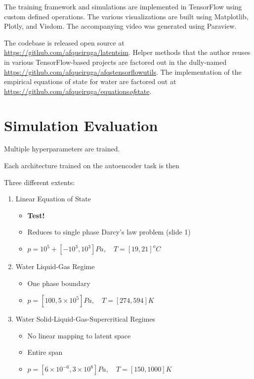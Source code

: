 \documentclass[]{article}
\begin{document}
The training framework and simulations are implemented in TensorFlow
using custom defined operations. The various visualizations are built
using Matplotlib, Plotly, and Visdom. The accompanying video was
generated using Paraview.

The codebase is released open source at
\url{https://github.com/afqueiruga/latentsim}. Helper methods that the
author reuses in various TensorFlow-based projects are factored out in
the dully-named \url{https://github.com/afqueiruga/afqstensorflowutils}.
The implementation of the empirical equations of state for water are
factored out at
\href{https://github.com/afqueiruga/equations_of_state}{https://github.com/afqueiruga/equations\emph{of}state}.

\hypertarget{header-n3359}{%
\section{Simulation Evaluation}\label{header-n3359}}

Multiple hyperparameters are trained.

Each architecture trained on the autoencoder task is then

Three different extents:

\begin{enumerate}
\def\labelenumi{\arabic{enumi}.}
\item
  Linear Equation of State

  \begin{itemize}
  \item
    \textbf{Test!}
  \item
    Reduces to single phase Darcy's law problem (slide 1)
  \item
    \( p = 10^5+[-10^3, 10^3] Pa,\quad T = [ 19, 21 ] ^o C\)
  \end{itemize}
\item
  Water Liquid-Gas Regime

  \begin{itemize}
  \item
    One phase boundary 
  \item
    \( p = [100,5\times 10^5] Pa, \quad T = [274,594] K\)
  \end{itemize}
\item
  Water Solid-Liquid-Gas-Supercritical Regimes

  \begin{itemize}
  \item
    No linear mapping to latent space 
  \item
    Entire span
  \item
    \( p = [6\times 10^{-6},3\times 10^8]Pa, \quad T = [150,1000] K \)
  \end{itemize}
\end{enumerate}
\end{document}
